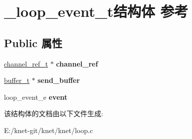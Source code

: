 \hypertarget{struct__loop__event__t}{}\section{\+\_\+loop\+\_\+event\+\_\+t结构体 参考}
\label{struct__loop__event__t}
\subsection*{Public 属性}
\begin{DoxyCompactItemize}
\item 
\hypertarget{struct__loop__event__t_a004e7698edee7fd1b94b08f4be4f0ad1}{}\hyperlink{struct__channel__ref__t}{channel\+\_\+ref\+\_\+t} $\ast$ {\bfseries channel\+\_\+ref}\label{struct__loop__event__t_a004e7698edee7fd1b94b08f4be4f0ad1}

\item 
\hypertarget{struct__loop__event__t_a95cfa23b9392db798b8fbcc41f094614}{}\hyperlink{struct__buffer__t}{buffer\+\_\+t} $\ast$ {\bfseries send\+\_\+buffer}\label{struct__loop__event__t_a95cfa23b9392db798b8fbcc41f094614}

\item 
\hypertarget{struct__loop__event__t_a76dd6f9dca6bec4527fbe55184812a70}{}loop\+\_\+event\+\_\+e {\bfseries event}\label{struct__loop__event__t_a76dd6f9dca6bec4527fbe55184812a70}

\end{DoxyCompactItemize}


该结构体的文档由以下文件生成\+:\begin{DoxyCompactItemize}
\item 
E\+:/knet-\/git/knet/knet/loop.\+c\end{DoxyCompactItemize}
